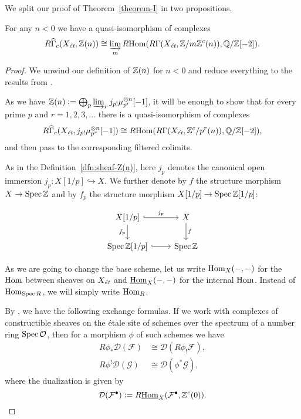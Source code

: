 \documentclass{article}
\numberwithin{equation}{section}
\begin{document}
We split our proof of Theorem~\ref{theorem-I} in two propositions.

\begin{proposition}
  For any $n < 0$ we have a quasi-isomorphism of complexes
  \begin{equation}
    \label{eqn:duality-quasi-isomorphism-1}
    R\widehat{\Gamma}_c (X_\et, \ZZ (n)) \cong
    \varinjlim_m \RHom (R\Gamma (X_\et, \ZZ/m\ZZ^c (n)), \QQ/\ZZ [-2]).
  \end{equation}

  \begin{proof}
    We unwind our definition of $\ZZ (n)$ for $n < 0$ and reduce everything to
    the results from \cite{Geisser-2010}.

    \vspace{1em}

    As we have
    $\ZZ (n) \dfn \bigoplus_p \varinjlim_r j_{p!} \mu_{p^r}^{\otimes n} [-1]$,
    it will be enough to show that for every prime $p$ and $r=1,2,3,\ldots$
    there is a quasi-isomorphism of complexes
    \[ R\widehat{\Gamma}_c (X_\et, j_{p!} \mu_{p^r}^{\otimes n} [-1]) \cong
    \RHom (R\Gamma (X_\et, \ZZ^c/p^r (n)), \QQ/\ZZ [-2]), \]
    and then pass to the corresponding filtered colimits.

    As in the Definition~\ref{dfn:sheaf-Z(n)}, here $j_p$ denotes the canonical
    open immersion $j_p\colon X[1/p] \hookrightarrow X$. We further denote by
    $f$ the structure morphism $X\to \Spec \ZZ$ and by $f_p$ the structure
    morphism $X [1/p] \to \Spec \ZZ [1/p]$:

    \[ \begin{tikzcd}
      X [1/p]\ar[hookrightarrow]{r}{j_p}\ar{d}[swap]{f_p} & X\ar{d}{f} \\
      \Spec \ZZ [1/p]\ar[hookrightarrow]{r} & \Spec \ZZ
    \end{tikzcd} \]

    As we are going to change the base scheme, let us write $\Hom_X (-,-)$ for
    the $\Hom$ between sheaves on $X_\et$ and $\iHom_X (-,-)$ for the
    internal $\Hom$. Instead of $\Hom_{\Spec R}$, we will simply write
    $\Hom_R$.

    By \cite[Proposition 7.10, (c)]{Geisser-2010}, we have the following
    exchange formulas. If we work with complexes of constructible sheaves on the
    étale site of schemes over the spectrum of a number ring
    $\Spec\mathcal{O}$, then for a morphism $\phi$ of such schemes we have
    \begin{align}
      \label{eqn:exchange-formula-1} R \phi_* \mathcal{D} (\mathcal{F}) & \cong \mathcal{D} (R \phi_! \mathcal{F}),\\
      \label{eqn:exchange-formula-2} R \phi^! \mathcal{D} (\mathcal{G}) & \cong \mathcal{D} (\phi^* \mathcal{G}),
    \end{align}
    where the dualization is given by
    \[ \mathcal{D} (\mathcal{F}^\bullet) \dfn
    R\iHom_X (\mathcal{F}^\bullet, \ZZ^c (0)). \]


\end{proof}
\end{proposition}
\end{document}

